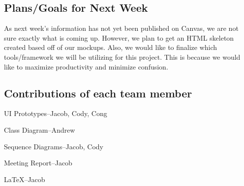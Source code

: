 \documentclass[12pt]{article}
\begin{document}
		\subsection{Plans/Goals for Next Week}

		As next week's information has not yet been published on Canvas, we are not sure exactly what is coming up. 
		However, we plan to get an HTML skeleton created based off of our mockups. 
		Also, we would like to finalize which tools/framework we will be utilizing for this project. 
		This is because we would like to maximize productivity and minimize confusion.

		\subsection{Contributions of each team member}
		
		\quad UI Prototypes--Jacob, Cody, Cong \par
		Class Diagram--Andrew \par
		Sequence Diagrams--Jacob, Cody \par
		Meeting Report--Jacob \par
		LaTeX--Jacob 
\end{document}
